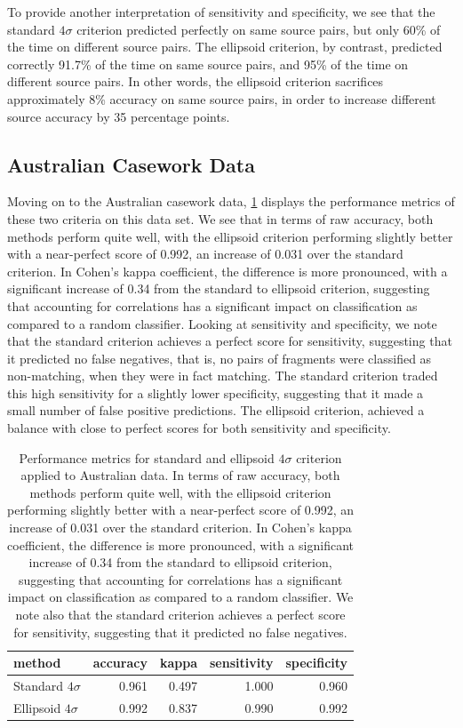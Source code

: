 \documentclass[a4paper]{article}
\begin{document}
To provide another interpretation of sensitivity and specificity, we see that the standard $4\sigma$ criterion predicted perfectly on same source pairs, but only 60\% of the time on different source pairs. The ellipsoid criterion, by contrast, predicted correctly 91.7\% of the time on same source pairs, and 95\% of the time on different source pairs. In other words, the ellipsoid criterion sacrifices approximately 8\% accuracy on same source pairs, in order to increase different source accuracy by 35 percentage points.

\subsection{Australian Casework Data}

Moving on to the Australian casework data, \cref{tab:std_metrics_aus} displays the performance metrics of these two criteria on this data set. We see that in terms of raw accuracy, both methods perform quite well, with the ellipsoid criterion performing slightly better with a near-perfect score of 0.992, an increase of 0.031 over the standard criterion. In Cohen's kappa coefficient, the difference is more pronounced, with a significant increase of 0.34 from the standard to ellipsoid criterion, suggesting that accounting for correlations has a significant impact on classification as compared to a random classifier. Looking at sensitivity and specificity, we note that the standard criterion achieves a perfect score for sensitivity, suggesting that it predicted no false negatives, that is, no pairs of fragments were classified as non-matching, when they were in fact matching. The standard criterion traded this high sensitivity for a slightly lower specificity, suggesting that it made a small number of false positive predictions. The ellipsoid criterion, achieved a balance with  close to perfect scores for both sensitivity and specificity.

\begin{table}[h]
	\centering
    \begin{tabular}{lrrrr}
        \hline
		method       & accuracy  & kappa      & sensitivity & specificity \\ \hline
        Standard $4\sigma$ & 0.961 & 0.497 & 1.000 &  0.960\\
		Ellipsoid $4\sigma$  & 0.992 & 0.837 & 0.990 & 0.992\\ \hline
	\end{tabular}
	\caption{Performance metrics for standard and ellipsoid $4\sigma$ criterion applied to Australian data. In terms of raw accuracy, both methods perform quite well, with the ellipsoid criterion performing slightly better with a near-perfect score of 0.992, an increase of 0.031 over the standard criterion. In Cohen's kappa coefficient, the difference is more pronounced, with a significant increase of 0.34 from the standard to ellipsoid criterion, suggesting that accounting for correlations has a significant impact on classification as compared to a random classifier. We note also that the standard criterion achieves a perfect score for sensitivity, suggesting that it predicted no false negatives.}
	\label{tab:std_metrics_aus}
\end{table}
\end{document}
